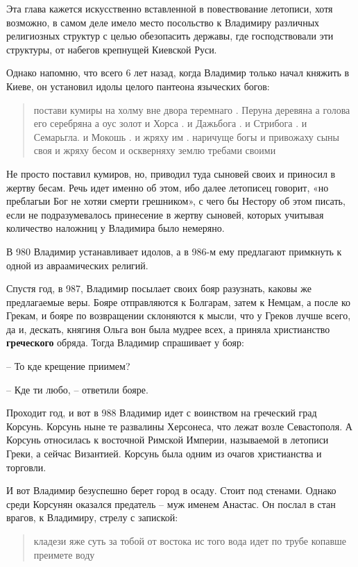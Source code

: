 \documentclass[a5paper,11pt,openany]{article}
\begin{document}
Эта глава кажется искусственно вставленной в повествование летописи, хотя возможно, в самом деле имело место посольство к Владимиру различных религиозных структур с целью обезопасить державы, где господствовали эти структуры, от набегов крепнущей Киевской Руси.

Однако напомню, что всего 6 лет назад, когда Владимир только начал княжить в Киеве, он установил идолы целого пантеона языческих богов:

\begin{quotation}
\noindent постави кумиры на холму вне двора теремнаго . Перуна деревяна а голова его серебряна а оус золот и Хорса . и Дажьбога . и Стрибога . и Семарьгла. и Мокошь . и жряху им . наричуще богы и привожаху сыны своя и жряху бесом и оскверняху землю требами своими
\end{quotation}

   Не просто поставил кумиров, но, приводил туда сыновей своих и приносил в жертву бесам. Речь идет именно об этом, ибо далее летописец говорит, «но преблагыи Бог не хотяи смерти грешником», с чего бы Нестору об этом писать, если не подразумевалось принесение в жертву сыновей, которых учитывая количество наложниц у Владимира было немеряно.

   В 980 Владимир устанавливает идолов, а в 986-м ему предлагают примкнуть к одной из авраамических религий. 

   Спустя год, в 987, Владимир посылает своих бояр разузнать, каковы же предлагаемые веры. Бояре отправляются к Болгарам, затем к Немцам, а после ко Грекам, и бояре по возвращении склоняются к мысли, что у Греков лучше всего, да и, дескать, княгиня Ольга вон была мудрее всех, а приняла христианство \textbf{греческого} обряда. Тогда Владимир спрашивает у бояр:

 – То кде крещение приимем?

 – Кде ти любо, – ответили бояре.

   Проходит год, и вот в 988 Владимир идет с воинством на греческий град Корсунь. Корсунь ныне те развалины Херсонеса, что лежат возле Севастополя. А Корсунь относилась к восточной Римской Империи, называемой в летописи Греки, а сейчас Византией. Корсунь была одним из очагов христианства и торговли.

   И вот Владимир безуспешно берет город в осаду. Стоит под стенами. Однако среди Корсунян оказался предатель – муж именем Анастас. Он послал в стан врагов, к Владимиру, стрелу с запиской:

\begin{quotation}
\noindent кладези яже суть за тобой от востока ис того вода идет по трубе копавше преимете воду
\end{quotation}
\end{document}
